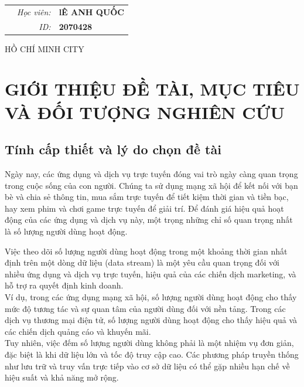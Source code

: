 \documentclass[a4paper,13pt]{article}
\theoremstyle{mytheor}
\begin{document}
\begin{titlepage}
\begin{center}
\begin{tabular}{c}
\end{tabular}
\end{center}

\vspace{1cm}

\begin{table}[h]
\begin{tabular}{rrl}
\hspace{5.6cm} 
&\textit{Học viên: } & \textbf{lÊ ANH QUỐC}\\
&\textit{ID: } & \textbf{2070428}\\

\end{tabular}
\end{table}
\vspace{1cm}
\begin{center}
{\footnotesize HỒ CHÍ MINH CITY}
\end{center}
\end{titlepage}




\renewcommand{\contentsname}{Content}
\newpage
\vspace{1cm}
\tableofcontents
\newpage
\section{GIỚI THIỆU ĐỀ TÀI, MỤC TIÊU VÀ ĐỐI TƯỢNG NGHIÊN CỨU}
\subsection{Tính cấp thiết và lý do chọn đề tài}
\hspace{2em}Ngày nay, các ứng dụng và dịch vụ trực tuyến đóng vai trò ngày càng quan trọng trong cuộc sống của con người. 
Chúng ta sử dụng mạng xã hội để kết nối với bạn bè và chia sẻ thông tin, mua sắm trực tuyến để tiết kiệm thời gian và tiền bạc, 
hay xem phim và chơi game trực tuyến để giải trí. Để đánh giá hiệu quả hoạt động của các ứng dụng và dịch vụ này, 
một trọng những chỉ số quan trọng nhất là số lượng người dùng hoạt động.

Việc theo dõi số lượng người dùng hoạt động trong một khoảng thời gian nhất định trên một dòng dữ liệu (data stream) 
là một yêu cầu quan trọng đối với nhiều ứng dụng và dịch vụ trực tuyến, hiệu quả của các chiến dịch marketing, 
và hỗ trợ ra quyết định kinh doanh.\\
Ví dụ, trong các ứng dụng mạng xã hội, số lượng người dùng hoạt động cho thấy mức độ tương tác 
và sự quan tâm của người dùng đối với nền tảng. Trong các dịch vụ thương mại điện tử, số lượng người dùng hoạt động cho thấy hiệu quả 
và các chiến dịch quảng cáo và khuyến mãi. \\
Tuy nhiên, việc đếm số lượng người dùng không phải là một nhiệm vụ đơn giản, đặc biệt là khi dữ liệu lớn 
và tốc độ truy cập cao. Các phương pháp truyền thống như lưu trữ và truy vấn trực tiếp vào cơ sở dữ liệu có thể gặp nhiều hạn chế về hiệu suất 
và khả năng mở rộng.\\
\end{document}
